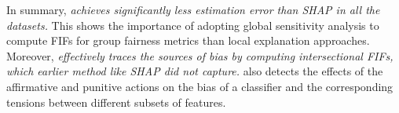 In summary, \textit{{\fairXplainer} achieves significantly less estimation error than SHAP in all the datasets.} This shows the importance of adopting global sensitivity analysis to compute FIFs for group fairness metrics than local explanation approaches. Moreover, \textit{{\fairXplainer} effectively traces the sources of bias by computing intersectional FIFs, which earlier method like SHAP {did not capture}.} {\fairXplainer} also detects the effects of the affirmative and punitive actions on the bias of a classifier and the corresponding tensions between different subsets of features. %




